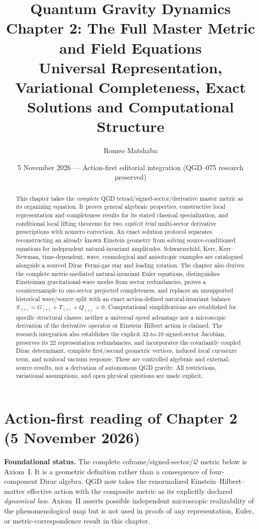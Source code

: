 \documentclass[11pt,a4paper]{article}
\title{\vspace{-9mm}\textbf{Quantum Gravity Dynamics}\\[4pt]
\large Chapter 2: The Full Master Metric and Field Equations\\[6pt]
\normalsize Universal Representation, Variational Completeness, Exact Solutions and Computational Structure}
\author{Romeo Matshaba}
\date{5 November 2026 --- Action-first editorial integration (QGD--075 research preserved)}
\begin{document}
\maketitle
\begin{abstract}
This chapter takes the \emph{complete} QGD tetrad/signed-sector/derivative master metric as its organizing equation. It proves general algebraic properties, constructive local representation and completeness results for its stated classical specialization, and conditional local lifting theorems for two \emph{explicit trial} multi-sector derivative prescriptions with nonzero correction. An exact solution protocol separates reconstructing an already known Einstein geometry from solving source-conditioned equations for independent natural-invariant amplitudes. Schwarzschild, Kerr, Kerr--Newman, time-dependent, wave, cosmological and anisotropic examples are catalogued alongside a sourced Dirac Fermi-gas star and leading rotation. The chapter also derives the complete metric-mediated natural-invariant Euler equations, distinguishes Einsteinian gravitational-wave modes from sector redundancies, proves a counterexample to one-sector projected completeness, and replaces an unsupported historical wave/source split with an exact action-defined natural-invariant balance $S_{(s)}=G_{(s)}+T_{(s)}+Q_{(s)}=0$. Computational simplifications are established for specific structural classes; neither a universal speed advantage nor a microscopic derivation of the derivative operator or Einstein--Hilbert action is claimed. The research integration also establishes the explicit 32-to-10 signed-sector Jacobian, preserves its 22 representation redundancies, and incorporates the covariantly coupled Dirac determinant, complete first/second geometric vertices, induced local curvature term, and nonlocal vacuum response. These are controlled algebraic and external-source results, not a derivation of autonomous QGD gravity. All restrictions, variational assumptions, and open physical questions are made explicit.
\end{abstract}

\section*{Action-first reading of Chapter 2 (5 November 2026)}
\noindent\textbf{Foundational status.} The complete coframe/signed-sector/$\mathcal Q$ metric below is Axiom~I. It is a geometric definition rather than a consequence of four-component Dirac algebra. QGD now takes the renormalized Einstein--Hilbert--matter effective action with the composite metric as its explicitly declared \emph{dynamical law}. Axiom~II asserts possible independent microscopic realizability of the phenomenological map but is not used in proofs of any representation, Euler, or metric-correspondence result in this chapter.
\end{document}
